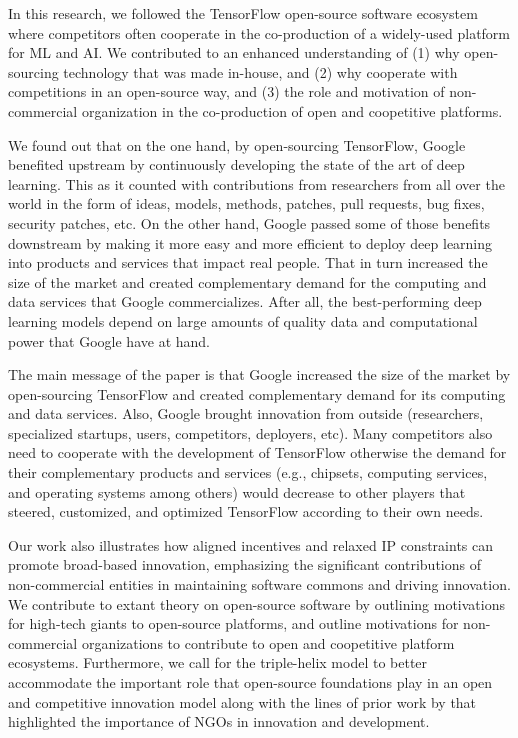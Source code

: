 \documentclass[CHICAGO,Times1COL]{WileyNJDv5} %
\begin{document}
In this research, we followed the TensorFlow open-source software ecosystem where competitors often cooperate in the co-production of a widely-used platform for \ac{ML} and \ac{AI}. We contributed to an enhanced understanding of (1) why open-sourcing technology that was made in-house, and (2) why cooperate with competitions in an open-source way, and (3) the role and motivation of non-commercial organization in the co-production of open and coopetitive platforms. 

We found out that on the one hand, by open-sourcing TensorFlow, Google benefited upstream by continuously developing the state of the art of deep learning. This as it counted with contributions from researchers from all over the world in the form of ideas, models, methods, patches, pull requests, bug fixes, security patches, etc.  On the other hand, Google passed some of those benefits downstream by making it more easy and more efficient to deploy deep learning into products and services that impact real people. That in turn increased the size of the market and created complementary demand for the computing and data services that Google commercializes. After all, the best-performing deep learning models depend on large amounts of quality data and computational power that Google have at hand. 


The main message of the paper is that Google increased the size of the market by open-sourcing TensorFlow and created complementary demand for its computing and data services. Also, Google brought innovation from outside (researchers, specialized startups, users, competitors, deployers, etc). Many competitors also need to cooperate with the development of TensorFlow otherwise the demand for their complementary products and services (e.g., chipsets, computing services, and operating systems among others) would decrease to other players that steered, customized, and optimized TensorFlow according to their own needs.   

Our work also  illustrates how aligned incentives and relaxed IP constraints can promote broad-based innovation, emphasizing the significant contributions of non-commercial entities in maintaining software commons and driving innovation. We contribute to extant theory on open-source software by  outlining motivations for high-tech giants to open-source platforms, and outline motivations for non-commercial organizations to contribute to open and coopetitive platform ecosystems. Furthermore, we call for the triple-helix model to better accommodate the important role that open-source foundations play in an open and competitive innovation model along with the lines of prior work by \citep{SIANIPAR2012197} that highlighted the importance of NGOs in innovation and development. 
\end{document}
